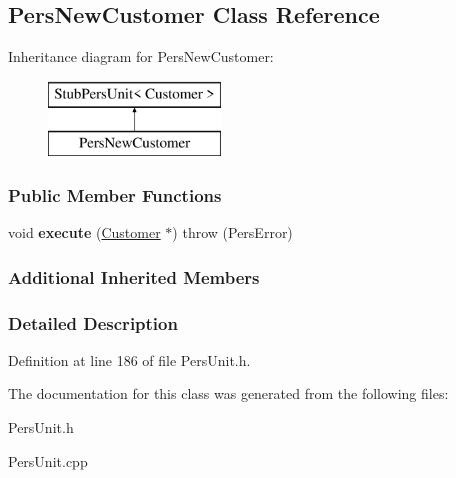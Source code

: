 \hypertarget{classPersNewCustomer}{\subsection{Pers\-New\-Customer Class Reference}
\label{d2/df7/classPersNewCustomer}
}
Inheritance diagram for Pers\-New\-Customer\-:\begin{figure}[H]
\begin{center}
\leavevmode
\includegraphics[height=2.000000cm]{d2/df7/classPersNewCustomer}
\end{center}
\end{figure}
\subsubsection*{Public Member Functions}
\begin{DoxyCompactItemize}
\item 
\hypertarget{classPersNewCustomer_ad51534c9c036e6eb8b9294242d5631ea}{void {\bfseries execute} (\hyperlink{classCustomer}{Customer} $\ast$)  throw (\-Pers\-Error)}\label{d2/df7/classPersNewCustomer_ad51534c9c036e6eb8b9294242d5631ea}

\end{DoxyCompactItemize}
\subsubsection*{Additional Inherited Members}


\subsubsection{Detailed Description}


Definition at line 186 of file Pers\-Unit.\-h.



The documentation for this class was generated from the following files\-:\begin{DoxyCompactItemize}
\item 
Pers\-Unit.\-h\item 
Pers\-Unit.\-cpp\end{DoxyCompactItemize}
